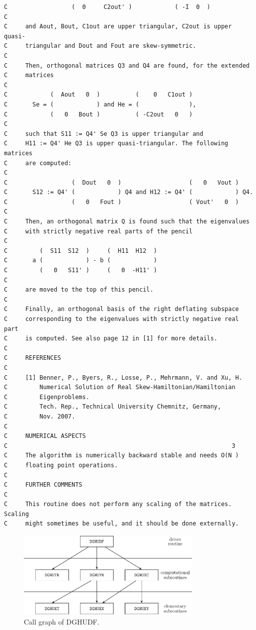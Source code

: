 \documentclass[a4paper,10pt]{article}
\begin{document}
\begin{verbatim}
C                  (  0     C2out' )            ( -I  0  )
C
C     and Aout, Bout, C1out are upper triangular, C2out is upper quasi-
C     triangular and Dout and Fout are skew-symmetric.
C
C     Then, orthogonal matrices Q3 and Q4 are found, for the extended
C     matrices
C
C            (  Aout   0  )          (    0   C1out )
C       Se = (            ) and He = (              ),
C            (   0   Bout )          ( -C2out   0   )
C
C     such that S11 := Q4' Se Q3 is upper triangular and
C     H11 := Q4' He Q3 is upper quasi-triangular. The following matrices
C     are computed:
C
C                  (  Dout   0  )                   (   0   Vout )
C       S12 := Q4' (            ) Q4 and H12 := Q4' (            ) Q4.
C                  (   0   Fout )                   ( Vout'   0  )
C
C     Then, an orthogonal matrix Q is found such that the eigenvalues
C     with strictly negative real parts of the pencil
C
C         (  S11  S12  )     (  H11  H12  )
C       a (            ) - b (            )
C         (   0   S11' )     (   0  -H11' )
C
C     are moved to the top of this pencil.
C
C     Finally, an orthogonal basis of the right deflating subspace
C     corresponding to the eigenvalues with strictly negative real part
C     is computed. See also page 12 in [1] for more details.
C
C     REFERENCES
C
C     [1] Benner, P., Byers, R., Losse, P., Mehrmann, V. and Xu, H.
C         Numerical Solution of Real Skew-Hamiltonian/Hamiltonian
C         Eigenproblems.
C         Tech. Rep., Technical University Chemnitz, Germany,
C         Nov. 2007.
C
C     NUMERICAL ASPECTS
C                                                               3
C     The algorithm is numerically backward stable and needs O(N )
C     floating point operations.
C
C     FURTHER COMMENTS
C
C     This routine does not perform any scaling of the matrices. Scaling
C     might sometimes be useful, and it should be done externally.
\end{verbatim}
%
\begin{figure}[ht]
 \centering
 \includegraphics[width=0.8\textwidth]{real_unfactored.pdf}
 \caption{Call graph of DGHUDF.}
\end{figure}
%
\end{document}
